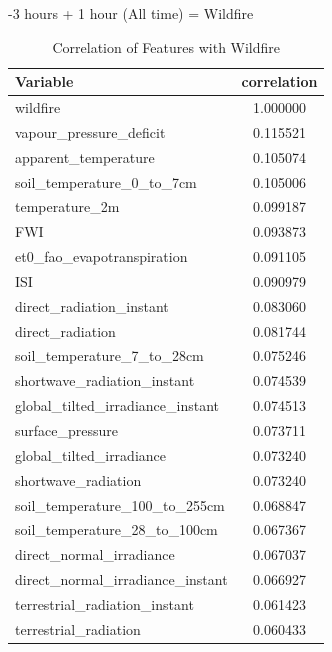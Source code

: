 -3 hours + 1 hour (All time) = Wildfire
\begin{table}[H]
	\caption{Correlation of Features with Wildfire}
	\centering
	\label{wildfire_correlation}
	\begin{tabular}{lc}
		Variable                                   & \multicolumn{1}{l}{correlation} \\ \hline
		wildfire                                  & 1.000000    \\ 
		vapour\_pressure\_deficit                 & 0.115521    \\ 
		apparent\_temperature                     & 0.105074    \\ 
		soil\_temperature\_0\_to\_7cm            & 0.105006    \\ 
		temperature\_2m                           & 0.099187    \\ 
		FWI                                      & 0.093873    \\ 
		et0\_fao\_evapotranspiration             & 0.091105    \\ 
		ISI                                       & 0.090979    \\ 
		direct\_radiation\_instant               & 0.083060    \\ 
		direct\_radiation                        & 0.081744    \\ 
		soil\_temperature\_7\_to\_28cm           & 0.075246    \\ 
		shortwave\_radiation\_instant            & 0.074539    \\ 
		global\_tilted\_irradiance\_instant       & 0.074513    \\ 
		surface\_pressure                         & 0.073711    \\ 
		global\_tilted\_irradiance                & 0.073240    \\ 
		shortwave\_radiation                     & 0.073240    \\ 
		soil\_temperature\_100\_to\_255cm         & 0.068847    \\ 
		soil\_temperature\_28\_to\_100cm          & 0.067367    \\ 
		direct\_normal\_irradiance                & 0.067037    \\ 
		direct\_normal\_irradiance\_instant       & 0.066927    \\ 
		terrestrial\_radiation\_instant          & 0.061423    \\ 
		terrestrial\_radiation                    & 0.060433    \\ 

\end{tabular}
\end{table}
